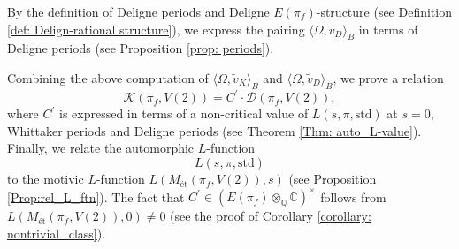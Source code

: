 \documentclass[11pt, a4paper]{amsart}
\theoremstyle{plain}
\theoremstyle{definition}
\numberwithin{equation}{section}
\def\CC{\mathbb{C}}
\def\QQ{\mathbb{Q}}
\begin{document}
\par By the definition of Deligne periods and Deligne $E(\pi_f)$-structure (see Definition \ref{def: Delign-rational structure}), we express the pairing $\langle \Omega, \tilde{v}_{D} \rangle_{B}$
in terms of Deligne periods (see Proposition \ref{prop: periods}). 

\par Combining the above computation of $\langle \Omega, \tilde{v}_{K} \rangle_{B}$ and $\langle \Omega, \tilde{v}_{D} \rangle_{B}$, we prove a relation 
\begin{equation*}
    \mathcal{K}(\pi_f, V(2)) = C^{\prime} \cdot \mathcal{D}(\pi_f, V(2)), 
\end{equation*}
where $C^{\prime}$ is expressed in terms of a non-critical value of $L(s, \pi, \mathrm{std})$ at $s = 0$, Whittaker periods and Deligne periods (see Theorem \ref{Thm: auto_L-value}). Finally, we relate the automorphic $L$-function $$L(s, \pi, \mathrm{std})$$ to the motivic $L$-function $L(M_{\text{\'et}}(\pi_f, V(2)), s)$ (see Proposition \ref{Prop:rel_L_ftn}). The fact that $C^{\prime} \in (E(\pi_f) \otimes_{\QQ} \CC)^{\times}$ follows from $L(M_{\text{\'et}}(\pi_f, V(2)), 0) \neq 0$ (see the proof of Corollary \ref{corollary: nontrivial_class}). 
\end{document}
